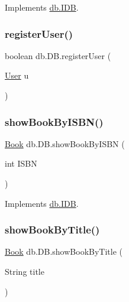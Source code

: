 Implements \hyperlink{interfacedb_1_1_i_d_b_a92913d9357ef22978adc35d3fb9d3590}{db.\+I\+DB}.

\mbox{\label{classdb_1_1_d_b_aa767c59cde3ca8f76c3acbd0c5348608}} 
\subsubsection{\texorpdfstring{register\+User()}{registerUser()}\hspace{0.1cm}{\footnotesize\ttfamily [2/2]}}
{\footnotesize\ttfamily boolean db.\+D\+B.\+register\+User (\begin{DoxyParamCaption}\item[{\hyperlink{classserver_1_1data_1_1_user}{User}}]{u }\end{DoxyParamCaption})}

\mbox{\label{classdb_1_1_d_b_ae902ce95ca7433f1f7f77419f4121f4c}} 
\subsubsection{\texorpdfstring{show\+Book\+By\+I\+S\+B\+N()}{showBookByISBN()}}
{\footnotesize\ttfamily \hyperlink{classserver_1_1data_1_1_book}{Book} db.\+D\+B.\+show\+Book\+By\+I\+S\+BN (\begin{DoxyParamCaption}\item[{int}]{I\+S\+BN }\end{DoxyParamCaption})}



Implements \hyperlink{interfacedb_1_1_i_d_b_aed305f6c36ff140084636a8eded479db}{db.\+I\+DB}.

\mbox{\label{classdb_1_1_d_b_a22a4c5b98facd4506b03828697220773}} 
\subsubsection{\texorpdfstring{show\+Book\+By\+Title()}{showBookByTitle()}}
{\footnotesize\ttfamily \hyperlink{classserver_1_1data_1_1_book}{Book} db.\+D\+B.\+show\+Book\+By\+Title (\begin{DoxyParamCaption}\item[{String}]{title }\end{DoxyParamCaption})}



